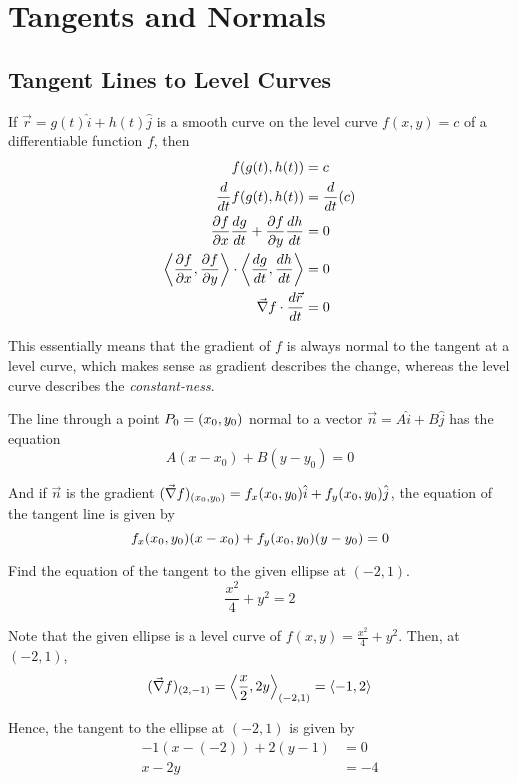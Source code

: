 \section{Tangents and Normals}

\subsection{Tangent Lines to Level Curves}

If $\vec{r} = g(t)\hat{i} + h(t)\hat{j}$ is a smooth curve on the level curve $f(x, y) = c$ of a differentiable function $f$, then
\begin{align*}
    f(g(t), h(t)) &= c \\
    \frac{d}{dt} f(g(t), h(t)) &= \frac{d}{dt}(c) \\
    \frac{\partial f}{\partial x} \frac{dg}{dt} + \frac{\partial f}{\partial y} \frac{dh}{dt} &= 0 \\
    \left\langle \frac{\partial f}{\partial x}, \frac{\partial f}{\partial y} \right\rangle \cdot \left\langle \frac{dg}{dt}, \frac{dh}{dt} \right\rangle &= 0 \\
    \vec{\nabla} f \cdot \frac{d\vec{r}}{dt} &= 0
\end{align*}

This essentially means that the gradient of $f$ is always normal to the tangent at a level curve, which makes sense as
gradient describes the change, whereas the level curve describes the \textit{constant-ness}.

The line through a point $P_0 = (x_0, y_0)$ normal to a vector $\vec{n} = A\hat{i} + B\hat{j}$ has the equation
\begin{equation}
    A(x - x_0) + B(y - y_0) = 0
\end{equation}

And if $\vec{n}$ is the gradient $(\vec{\nabla} f)_{(x_0, y_0)} = f_x(x_0, y_0)\hat{i} + f_y(x_0, y_0)\hat{j}$,
the equation of the tangent line is given by
\begin{equation}
    f_x(x_0, y_0) (x - x_0) + f_y (x_0, y_0) (y - y_0) = 0
\end{equation}

\begin{example}
    \normalfont Find the equation of the tangent to the given ellipse at $(-2, 1)$.
    $$\frac{x^2}{4} + y^2 = 2$$

    Note that the given ellipse is a level curve of $f(x, y) = \frac{x^2}{4} + y^2$. Then, at $(-2, 1)$,
    $$ (\vec{\nabla} f)_{(2, -1)} = \left\langle \frac{x}{2}, 2y \right\rangle_{(-2, 1)} = \langle -1, 2 \rangle $$

    Hence, the tangent to the ellipse at $(-2, 1)$ is given by
    \begin{align*}
        -1 (x - (-2)) + 2 (y - 1) &= 0 \\
        x - 2y &= -4
    \end{align*}
\end{example}


